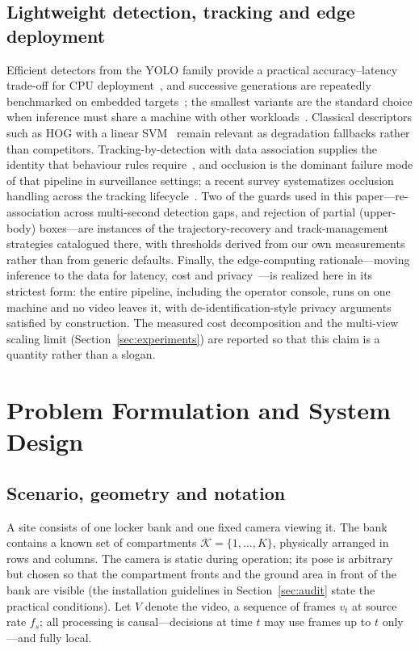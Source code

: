 \documentclass[journal,article,submit,oneauthor]{Definitions/mdpi}
\begin{document}
\subsection{Lightweight detection, tracking and edge deployment}
Efficient detectors from the YOLO family provide a practical accuracy--latency trade-off for
CPU deployment~\cite{redmon2016yolo,yolov8ultralytics}, and successive generations are
repeatedly benchmarked on embedded targets~\cite{reveles2025yolo11}; the smallest variants
are the standard choice when inference must share a machine with other
workloads~\cite{jia2025lpcf}. Classical descriptors such as HOG with a linear
SVM~\cite{dalal2005hog} remain relevant as degradation fallbacks rather than competitors.
Tracking-by-detection with data association supplies the identity that behaviour rules
require~\cite{zhang2022bytetrack}, and occlusion is the dominant failure mode of that
pipeline in surveillance settings; a recent survey systematizes occlusion handling across
the tracking
lifecycle~\cite{sun2025occlusion}. Two of the guards used in this paper---re-association
across multi-second detection gaps, and rejection of partial (upper-body) boxes---are
instances of the trajectory-recovery and track-management strategies catalogued there, with
thresholds derived from our own measurements rather than from generic defaults. Finally, the
edge-computing rationale---moving inference to the data for latency, cost and
privacy~\cite{shi2016edge}---is realized here in its strictest form: the entire pipeline,
including the operator console, runs on one machine and no video leaves it, with
de-identification-style privacy arguments~\cite{ribaric2016deid} satisfied by construction.
The measured cost decomposition and the multi-view scaling limit
(Section~\ref{sec:experiments}) are reported so that this claim is a quantity rather than a
slogan.
\section{Problem Formulation and System Design}
\label{sec:problem}

\subsection{Scenario, geometry and notation}
\label{sec:notation}
A site consists of one locker bank and one fixed camera viewing it. The bank contains a known
set of compartments $\mathcal{K}=\{1,\dots,K\}$, physically arranged in rows and columns. The
camera is static during operation; its pose is arbitrary but chosen so that the compartment
fronts and the ground area in front of the bank are visible (the installation guidelines in
Section~\ref{sec:audit} state the practical conditions). Let $V$ denote the video, a sequence
of frames $v_t$ at source rate $f_s$; all processing is causal---decisions at time $t$ may
use frames up to $t$ only---and fully local.
\end{document}
